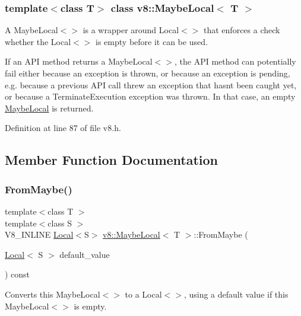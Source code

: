 \subsubsection*{template$<$class T$>$\newline
class v8\+::\+Maybe\+Local$<$ T $>$}

A Maybe\+Local$<$$>$ is a wrapper around Local$<$$>$ that enforces a check whether the Local$<$$>$ is empty before it can be used.

If an A\+PI method returns a Maybe\+Local$<$$>$, the A\+PI method can potentially fail either because an exception is thrown, or because an exception is pending, e.\+g. because a previous A\+PI call threw an exception that hasn\textquotesingle{}t been caught yet, or because a Terminate\+Execution exception was thrown. In that case, an empty \mbox{\hyperlink{classv8_1_1MaybeLocal}{Maybe\+Local}} is returned. 

Definition at line 87 of file v8.\+h.



\subsection{Member Function Documentation}
\mbox{\label{classv8_1_1MaybeLocal_ad99cb1e7ac1a4eac34c144faa4262407}} 
\subsubsection{\texorpdfstring{From\+Maybe()}{FromMaybe()}}
{\footnotesize\ttfamily template$<$class T $>$ \\
template$<$class S $>$ \\
V8\+\_\+\+I\+N\+L\+I\+NE \mbox{\hyperlink{classv8_1_1Local}{Local}}$<$S$>$ \mbox{\hyperlink{classv8_1_1MaybeLocal}{v8\+::\+Maybe\+Local}}$<$ T $>$\+::From\+Maybe (\begin{DoxyParamCaption}\item[{\mbox{\hyperlink{classv8_1_1Local}{Local}}$<$ S $>$}]{default\+\_\+value }\end{DoxyParamCaption}) const\hspace{0.3cm}{\ttfamily [inline]}}

Converts this Maybe\+Local$<$$>$ to a Local$<$$>$, using a default value if this Maybe\+Local$<$$>$ is empty. 

